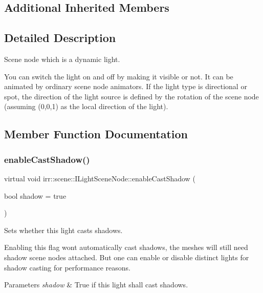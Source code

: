 \subsection*{Additional Inherited Members}


\subsection{Detailed Description}
Scene node which is a dynamic light. 

You can switch the light on and off by making it visible or not. It can be animated by ordinary scene node animators. If the light type is directional or spot, the direction of the light source is defined by the rotation of the scene node (assuming (0,0,1) as the local direction of the light). 

\subsection{Member Function Documentation}
\mbox{\label{classirr_1_1scene_1_1ILightSceneNode_a1520d051fe04bc8c5c8975fb3908161b}} 
\subsubsection{\texorpdfstring{enable\+Cast\+Shadow()}{enableCastShadow()}\hspace{0.1cm}{\footnotesize\ttfamily [1/2]}}
{\footnotesize\ttfamily virtual void irr\+::scene\+::\+I\+Light\+Scene\+Node\+::enable\+Cast\+Shadow (\begin{DoxyParamCaption}\item[{bool}]{shadow = {\ttfamily true} }\end{DoxyParamCaption})\hspace{0.3cm}{\ttfamily [pure virtual]}}



Sets whether this light casts shadows. 

Enabling this flag won\textquotesingle{}t automatically cast shadows, the meshes will still need shadow scene nodes attached. But one can enable or disable distinct lights for shadow casting for performance reasons. 
\begin{DoxyParams}{Parameters}
{\em shadow} & True if this light shall cast shadows. \\
\hline
\end{DoxyParams}
\mbox{\label{classirr_1_1scene_1_1ILightSceneNode_a1520d051fe04bc8c5c8975fb3908161b}} 
